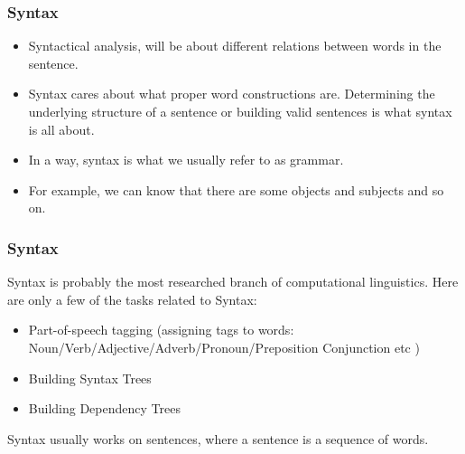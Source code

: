  
\begin{frame}[fragile]
  \frametitle{Syntax}
  \begin{itemize}
  \item Syntactical analysis, will be about different relations between words in the sentence.
  \item Syntax cares about what proper word constructions are. Determining the underlying structure of a sentence or building valid sentences is what syntax is all about. 
  \item In a way, syntax is what we usually refer to as grammar.
  \item For example, we can know that there are some objects and subjects and so on. 
  	  \end{itemize}
 \end{frame} 
 
\begin{frame}[fragile]
  \frametitle{Syntax}
  Syntax is probably the most researched branch of computational linguistics. Here are only a few of the tasks related to Syntax:
  \begin{itemize}
  \item Part-of-speech tagging (assigning tags to words: Noun/Verb/Adjective/Adverb/Pronoun/Preposition Conjunction etc )
\item Building Syntax Trees
\item Building Dependency Trees
  	  \end{itemize}
	  Syntax usually works on sentences, where a sentence is a sequence of words.
 \end{frame} 
 
